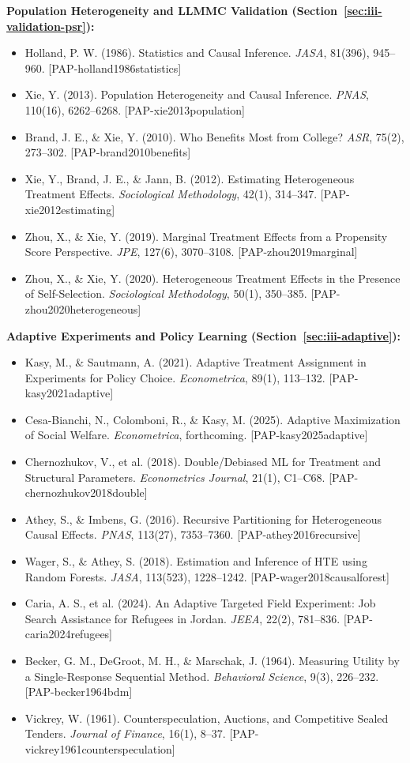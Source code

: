 \textbf{Population Heterogeneity and LLMMC Validation (Section~\ref{sec:iii-validation-psr}):}
\begin{itemize}[nosep]
\item Holland, P. W. (1986). Statistics and Causal Inference. \emph{JASA}, 81(396), 945--960. [PAP-holland1986statistics]
\item Xie, Y. (2013). Population Heterogeneity and Causal Inference. \emph{PNAS}, 110(16), 6262--6268. [PAP-xie2013population]
\item Brand, J. E., \& Xie, Y. (2010). Who Benefits Most from College? \emph{ASR}, 75(2), 273--302. [PAP-brand2010benefits]
\item Xie, Y., Brand, J. E., \& Jann, B. (2012). Estimating Heterogeneous Treatment Effects. \emph{Sociological Methodology}, 42(1), 314--347. [PAP-xie2012estimating]
\item Zhou, X., \& Xie, Y. (2019). Marginal Treatment Effects from a Propensity Score Perspective. \emph{JPE}, 127(6), 3070--3108. [PAP-zhou2019marginal]
\item Zhou, X., \& Xie, Y. (2020). Heterogeneous Treatment Effects in the Presence of Self-Selection. \emph{Sociological Methodology}, 50(1), 350--385. [PAP-zhou2020heterogeneous]
\end{itemize}

\textbf{Adaptive Experiments and Policy Learning (Section~\ref{sec:iii-adaptive}):}
\begin{itemize}[nosep]
\item Kasy, M., \& Sautmann, A. (2021). Adaptive Treatment Assignment in Experiments for Policy Choice. \emph{Econometrica}, 89(1), 113--132. [PAP-kasy2021adaptive]
\item Cesa-Bianchi, N., Colomboni, R., \& Kasy, M. (2025). Adaptive Maximization of Social Welfare. \emph{Econometrica}, forthcoming. [PAP-kasy2025adaptive]
\item Chernozhukov, V., et al. (2018). Double/Debiased ML for Treatment and Structural Parameters. \emph{Econometrics Journal}, 21(1), C1--C68. [PAP-chernozhukov2018double]
\item Athey, S., \& Imbens, G. (2016). Recursive Partitioning for Heterogeneous Causal Effects. \emph{PNAS}, 113(27), 7353--7360. [PAP-athey2016recursive]
\item Wager, S., \& Athey, S. (2018). Estimation and Inference of HTE using Random Forests. \emph{JASA}, 113(523), 1228--1242. [PAP-wager2018causalforest]
\item Caria, A. S., et al. (2024). An Adaptive Targeted Field Experiment: Job Search Assistance for Refugees in Jordan. \emph{JEEA}, 22(2), 781--836. [PAP-caria2024refugees]
\item Becker, G. M., DeGroot, M. H., \& Marschak, J. (1964). Measuring Utility by a Single-Response Sequential Method. \emph{Behavioral Science}, 9(3), 226--232. [PAP-becker1964bdm]
\item Vickrey, W. (1961). Counterspeculation, Auctions, and Competitive Sealed Tenders. \emph{Journal of Finance}, 16(1), 8--37. [PAP-vickrey1961counterspeculation]
\end{itemize}

